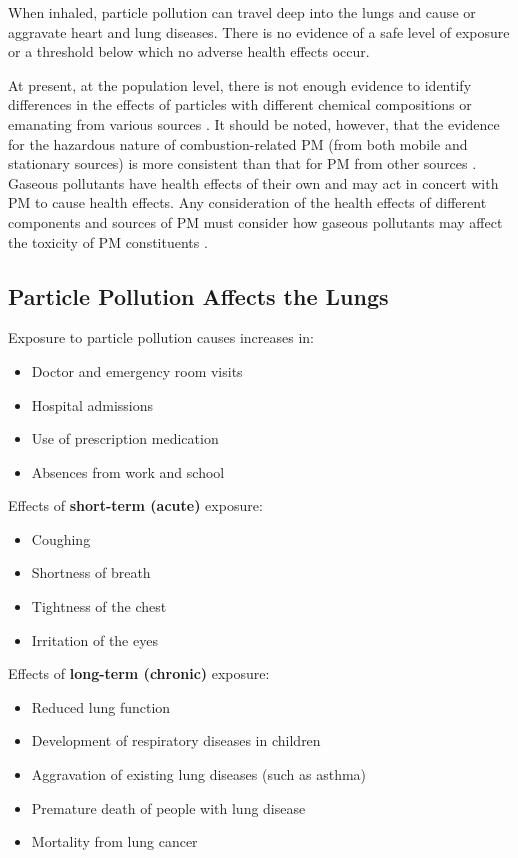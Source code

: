 \documentclass{article}
\begin{document}
When inhaled, particle pollution can travel deep into the lungs and cause or aggravate heart and lung diseases. There is no evidence of a safe level of exposure or a threshold below which no adverse health effects occur.

At present, at the population level, there is not enough evidence to identify differences in the effects of particles with different chemical compositions or emanating from various sources \citep{stanek2011attributing}. It should be noted, however, that the evidence for the hazardous nature of combustion-related PM (from both mobile and stationary sources) is more consistent than that for PM from other sources \citep{world2007health}. Gaseous pollutants have health effects of their own and may act in concert with PM to cause health effects. Any consideration of the health effects of different components and sources of PM must consider how gaseous pollutants may affect the toxicity of PM constituents \citep{adams2015particulate}.

\subsection{Particle Pollution Affects the Lungs}

Exposure to particle pollution causes increases in:
\begin{itemize}
    \item Doctor and emergency room visits
    \item Hospital admissions
    \item Use of prescription medication
    \item Absences from work and school
\end{itemize}

Effects of \textbf{short-term (acute)} exposure:
\begin{itemize}
    \item Coughing
    \item Shortness of breath
    \item Tightness of the chest
    \item Irritation of the eyes
\end{itemize}

Effects of \textbf{long-term (chronic)} exposure:
\begin{itemize}
    \item Reduced lung function
    \item Development of respiratory diseases in children
    \item Aggravation of existing lung diseases (such as asthma)
    \item Premature death of people with lung disease
    \item Mortality from lung cancer
\end{itemize}
\end{document}
